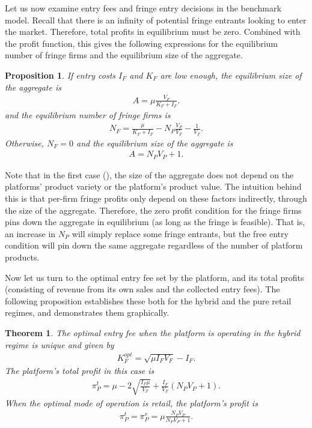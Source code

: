 \documentclass[a4paper]{article}
\newtheorem{proposition}{Proposition}
\newtheorem{theorem}{Theorem}
\begin{document}
Let us now examine entry fees and fringe entry decisions in the benchmark model.
Recall that there is an infinity of potential fringe entrants looking to enter the market.
Therefore, total profits in equilibrium must be zero.
Combined with the  profit function, this gives the following expressions for the equilibrium number of fringe firms and the equilibrium size of the aggregate.
\begin{proposition}
    \label{prop:equilibrium_aggregate_benchmark}
    If entry costs $I_F$ and $K_F$ are low enough, the equilibrium size of the aggregate is
    \begin{align}
        A = \mu \frac{V_F}{K_F + I_F}.
        \label{eq:aggregate_eq}
    \end{align}
    and the equilibrium number of fringe firms is
    \begin{align}
        N_F = \frac{\mu}{K_F + I_F} - N_P \frac{V_P}{V_F} - \frac{1}{V_F}.
        \label{eq:N_F_eq}
    \end{align}
    Otherwise,  $N_F = 0$ and the equilibrium size of the aggregate is
    \begin{align*}
        A = N_P V_P + 1.
    \end{align*}
\end{proposition}
Note that in the first case (), the size of the aggregate does not depend on the platforms' product variety or the platform's product value.
The intuition behind this is that per-firm fringe profits only depend on these factors indirectly, through the size of the aggregate.
Therefore, the zero profit condition for the fringe firms pins down the aggregate in equilibrium (as long as the fringe is feasible).
That is, an increase in $N_P$ will simply replace some fringe entrants, but the free entry condition will pin down the same aggregate regardless of the number of platform products.

Now let us turn to the optimal entry fee set by the platform, and its total profits (consisting of revenue from its own sales and the collected entry fees).
The following proposition establishes these both for the hybrid and the pure retail regimes, and  demonstrates them graphically.

\begin{theorem}
    \label{prop:optimal_entry_fee}
    The optimal entry fee when the platform is operating in the hybrid regime is unique and given by
    \begin{align}
        K_F^{opt} = \sqrt{\mu I_F V_F} - I_F. \label{eq:entry_fee_benchmark}
    \end{align}
    The platform's total profit in this case is
    \begin{align}
        \pi_P^{t} = \mu - 2\sqrt{\frac{I_F \mu}{V_F}} + \frac{I_F}{V_F} (N_P V_P + 1). \label{eq:platform_profits_hybrid_benchmark}
    \end{align}
    When the optimal mode of operation is retail, the platform's profit is
    \begin{align}
        \pi_P^{t} = \pi_P^{v} = \mu \frac{ N_P V_P}{N_P V_P + 1}. \label{eq:platform_profits_retail_benchmark}
    \end{align}
\end{theorem}
\end{document}
